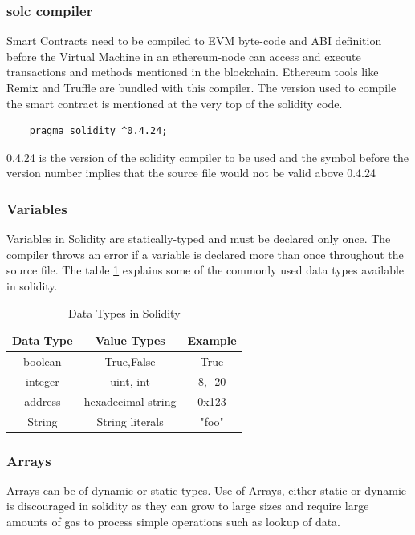 \documentclass[11pt,openright]{report}
\begin{document}
\subsubsection{solc compiler}
Smart Contracts need to be compiled to EVM byte-code and ABI definition before the Virtual Machine in an ethereum-node can access and execute transactions and methods mentioned in the blockchain. Ethereum tools like Remix and Truffle are bundled with this compiler. The version used to compile the smart contract is mentioned at the very top of the solidity code.

\begin{verbatim}
    pragma solidity ^0.4.24;
\end{verbatim}

0.4.24 is the version of the solidity compiler to be used and the symbol before the version number implies that the source file would not be valid above 0.4.24

\subsubsection{Variables}
Variables in Solidity are statically-typed and must be declared only once. The compiler throws an error if a variable is declared more than once throughout the source file. The table \ref{solidity_data_types} explains some of the commonly used data types available in solidity.
 
\begin{table}[!htbp]
    \renewcommand{\arraystretch}{1.3}
    \caption{Data Types in Solidity}
    \label{solidity_data_types}
    \centering
    \begin{tabular}{|c|c|c|}
        \hline
        \bfseries Data Type & \bfseries Value Types & \bfseries Example \\
        \hline\hline
        boolean & True,False & True \\ \hline
        integer & uint, int & 8, -20 \\ \hline
        address & hexadecimal string & 0x123 \\ \hline
        String & String literals & "foo" \\ \hline
    \end{tabular}
\end{table}

\newpage
\subsubsection{Arrays}
Arrays can be of dynamic or static types. Use of Arrays, either static or dynamic is discouraged in solidity as they can grow to large sizes and require large amounts of gas to process simple operations such as lookup of data.
\end{document}
